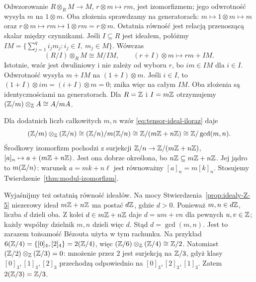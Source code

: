\begin{przyklad}
\label{prz:tensor-jednostka-ideal}
Odwzorowanie $R\otimes_R M\to M$,
$r\otimes m\mapsto rm$, jest izomorfizmem;
jego odwrotność wysyła $m$ na $1\otimes m$.
Oba złożenia sprawdzamy na generatorach:
$m\mapsto1\otimes m\mapsto m$ oraz
$r\otimes m\mapsto rm\mapsto1\otimes rm=r\otimes m$.
Ostatnia równość jest relacją przenoszącą skalar między czynnikami.
Jeśli $I\subseteq R$ jest ideałem, połóżmy
$IM=\{\sum_{j=1}^q i_jm_j:
i_j\in I,\ m_j\in M\}$.
Wówczas
\begin{equation}\label{eq:tensor-ideal-iloraz}
 (R/I)\otimes_R M\cong M/IM,
 \qquad (r+I)\otimes m\longmapsto rm+IM.
\end{equation}
Istotnie, wzór jest dwuliniowy i nie zależy
od wyboru $r$, bo $i m\in IM$ dla $i\in I$.
Odwrotność wysyła $m+IM$ na
$(1+I)\otimes m$. Jeśli $i\in I$, to
$(1+I)\otimes im=(i+I)\otimes m=0$;
znika więc na całym $IM$. Oba złożenia
są identycznościami na generatorach.
Dla $R=\mathbb{Z}$ i $I=m\mathbb{Z}$ otrzymujemy
$(\mathbb{Z}/m)\otimes_{\mathbb{Z}}A\cong A/mA$.
\end{przyklad}

\begin{przyklad}
Dla dodatnich liczb całkowitych $m,n$ wzór
\eqref{eq:tensor-ideal-iloraz} daje
\[
 (\mathbb{Z}/m)\otimes_{\mathbb{Z}}(\mathbb{Z}/n)
 \cong (\mathbb{Z}/n)/m(\mathbb{Z}/n)
 \cong \mathbb{Z}/(m\mathbb{Z}+n\mathbb{Z})
 \cong \mathbb{Z}/\gcd(m,n).
\]
Środkowy izomorfizm pochodzi z surjekcji
$\mathbb{Z}/n\to\mathbb{Z}/(m\mathbb{Z}+n\mathbb{Z})$, $[a]_n\mapsto a+(m\mathbb{Z}+n\mathbb{Z})$.
Jest ona dobrze określona, bo $n\mathbb{Z}\subseteq m\mathbb{Z}+n\mathbb{Z}$.
Jej jądro to $m(\mathbb{Z}/n)$: warunek $a=mk+n\ell$
jest równoważny $[a]_n=m[k]_n$.
Stosujemy Twierdzenie~\ref{thm:modul-izomorfizm}.

Wyjaśnijmy też ostatnią równość ideałów. Na mocy
Stwierdzenia~\ref{prop:idealy-Z-5} niezerowy ideał
$m\mathbb{Z}+n\mathbb{Z}$ ma postać $d\mathbb{Z}$, gdzie $d>0$.
Ponieważ $m,n\in d\mathbb{Z}$, liczba $d$ dzieli oba.
Z kolei $d\in m\mathbb{Z}+n\mathbb{Z}$ daje $d=um+vn$
dla pewnych $u,v\in\mathbb{Z}$; każdy wspólny dzielnik $m,n$
dzieli więc $d$. Stąd $d=\gcd(m,n)$.
Jest to zarazem tożsamość Bézouta użyta w tym rachunku.
Na przykład $6(\mathbb{Z}/4)=\{[0]_4,[2]_4\}=2(\mathbb{Z}/4)$,
więc $(\mathbb{Z}/6)\otimes_{\mathbb{Z}}(\mathbb{Z}/4)\cong\mathbb{Z}/2$.
Natomiast $(\mathbb{Z}/2)\otimes_{\mathbb{Z}}(\mathbb{Z}/3)=0$:
mnożenie przez $2$ jest surjekcją na $\mathbb{Z}/3$,
gdyż klasy $[0]_3,[1]_3,[2]_3$ przechodzą odpowiednio
na $[0]_3,[2]_3,[1]_3$. Zatem $2(\mathbb{Z}/3)=\mathbb{Z}/3$.
\end{przyklad}

